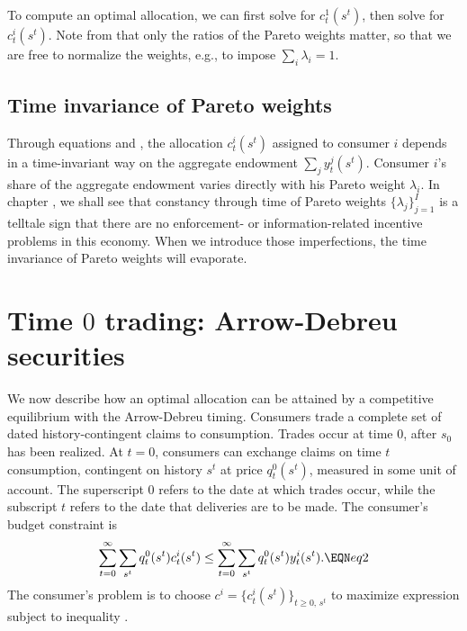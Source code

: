  To compute an optimal allocation, we can first solve  
for $c_t^1(s^t)$, then solve  for $c_t^i(s^t)$.
Note  from  that only the ratios of the Pareto weights matter,
so that we are free to normalize the weights, e.g., to impose
$\sum_i \lambda_i=1$.



\subsection{Time invariance of Pareto weights}
  Through  equations  and ,
the allocation $c_t^i(s^t)$ assigned to consumer $i$
depends in a time-invariant way on the aggregate endowment
$\sum_j y_t^j(s^t)$.  Consumer $i$'s share of the aggregate endowment varies
directly with his Pareto weight $\lambda_i$.   In chapter
, we shall see that  constancy through
time of Pareto weights
 $\{\lambda_j\}_{j=1}^I$ is a telltale sign that there are no
enforcement- or information-related  incentive problems
in this economy. %
When we introduce  those imperfections, the time invariance of  Pareto
weights will evaporate.
%


\section{Time $0$ trading: Arrow-Debreu securities}\label{sec:ADtime0}%
We now describe how an optimal allocation can be attained by a
competitive equilibrium with the Arrow-Debreu timing. Consumers
trade  a complete set of dated history-contingent claims to consumption. Trades occur at time $0$, after $s_0$
has been realized. At $t=0$, consumers can exchange claims on
time $t$ consumption, contingent on history $s^t$ at price
$q_t^0(s^t)$, measured in some unit of account. The superscript $0$ refers to the date at which
trades occur, while the subscript $t$ refers to the date that
deliveries are to be made.  The consumer's budget constraint is
$$ \sum_{t=0}^\infty \sum_{s^t}  q_t^0(s^t)  c_t^i(s^t)   \leq
   \sum_{t=0}^\infty \sum_{s^t}  q_t^0(s^t) y_t^i(s^t).   \EQN eq2 $$
The consumer's problem is to choose  
$c^i =\{c^i_t(s^t)\}_{t\geq0,\,s^t}$
to maximize expression  subject to inequality  .

